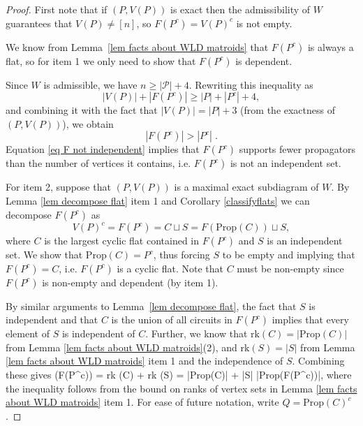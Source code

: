 \documentclass[11pt]{article}
\newcommand{\rk}{\textrm{rk} }
\def\ba #1\ea{\begin{align} #1 \end{align}}
\newcommand{\cP}{\mathcal{P}}
\newcommand{\Prop}{\textrm{Prop}}
\theoremstyle{remark}
\theoremstyle{definition}
\begin{document}
\begin{proof}

First note that if $(P,V(P))$ is exact then the admissibility of $W$ guarantees that $V(P) \neq [n]$, so $F(P^c) = V(P)^c$ is not empty. 

We know from Lemma~\ref{lem facts about WLD matroids} that $F(P^c)$ is always a flat, so for item 1 we only need to show that $F(P^c)$ is dependent.

Since $W$ is admissible, we have $n \geq |\cP| + 4$. Rewriting this inequality as
\[|V(P)| + |F(P^c)|  \geq  |P| + |P^c| +4,\]
and combining it with the fact that $|V(P)| = |P| + 3$ (from the exactness of $(P,V(P))$), we obtain
\begin{equation}\label{eq F not independent}|F(P^c)| > |P^c| \;.\end{equation}
Equation \eqref{eq F not independent} implies that $F(P^c)$ supports fewer propagators than the number of vertices it contains, i.e. $F(P^c)$ is not an independent set.

For item 2, suppose that $(P, V(P))$ is a maximal exact subdiagram of $W$. By Lemma \ref{lem decompose flat} item 1 and Corollary \ref{classifyflats} we can decompose $F(P^c)$ as
\begin{equation}\label{eq decompose F}V(P)^c = F(P^c) = C \sqcup S = F(\Prop(C)) \sqcup S,\end{equation}
where $C$ is the largest cyclic flat contained in $F(P^c)$ and $S$ is an independent set. We show that $\Prop(C) = P^c$, thus forcing $S$ to be empty and implying that $F(P^c) = C$, i.e. $F(P^c)$ is a cyclic flat. Note that $C$ must be non-empty since $F(P^c)$ is non-empty and dependent (by item 1). 

By similar arguments to Lemma~\ref{lem decompose flat}, the fact that $S$ is independent and that $C$ is the union of all circuits in $F(P^c)$ implies that every element of $S$ is independent of $C$. Further, we know that $\rk(C) = |\Prop(C)|$ from Lemma \ref{lem facts about WLD matroids}(2), and $\rk(S) = |S|$ from Lemma \ref{lem facts about WLD matroids} item 1 and the independence of $S$.  Combining these gives
\ba \rk\big(F(P^c)\big) = \rk(C) + \rk(S)  = |\Prop(C)| + |S| \leq |\Prop(F(P^c))|\;,\label{rank of comp flat} \ea 
where the inequality follows from the bound on ranks of vertex sets in Lemma \ref{lem facts about WLD matroids} item 1. For ease of future notation, write $Q = \Prop(C)^c$. 


\end{proof}
\end{document}
